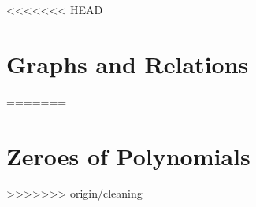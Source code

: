 \documentclass{xourse}
\begin{document}
<<<<<<< HEAD
\part{Graphs and Relations}


=======
\part{Zeroes of Polynomials}

>>>>>>> origin/cleaning
\end{document}
